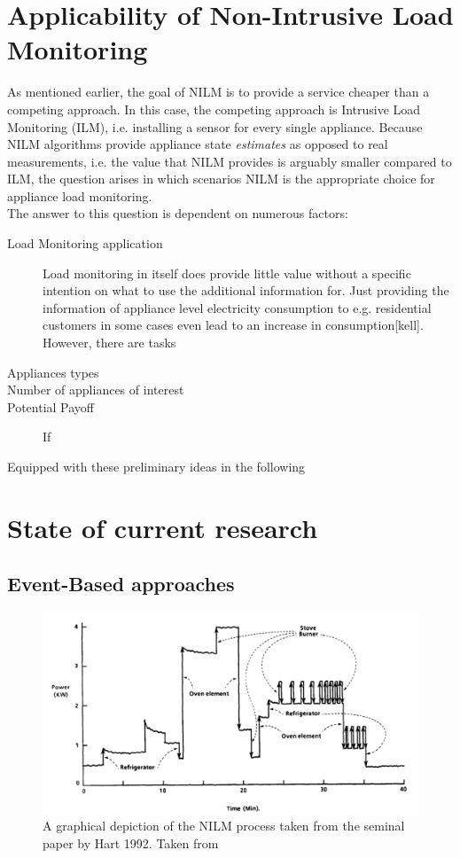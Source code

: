 \documentclass[11pt]{cmuthesis} %
\begin{document}
\section{Applicability of Non-Intrusive Load Monitoring}

As mentioned earlier, the goal of NILM is to provide a service cheaper than a competing approach. In this case, the competing approach is Intrusive Load Monitoring (ILM), i.e. installing a sensor for every single appliance. Because NILM algorithms provide appliance state \emph{estimates} as opposed to real measurements, i.e. the value that NILM provides is arguably smaller compared to ILM, the question arises in which scenarios NILM is the appropriate choice for appliance load monitoring.\\
The answer to this question is dependent on numerous factors:
\begin{description}
\item[Load Monitoring application] Load monitoring in itself does provide little value without a specific intention on what to use the additional information for. Just providing the information of appliance level electricity consumption to e.g. residential customers in some cases even lead to an increase in consumption[kell]. However, there are tasks 
\item[Appliances types]
\item[Number of appliances of interest]
\item[Potential Payoff] If
\end{description}

Equipped with these preliminary ideas in the following


\section{State of current research}

\subsection{Event-Based approaches}
\begin{figure}
\centering
\includegraphics[width=0.8\linewidth]{nilm_hart.png}
\caption[A graphical depiction of the NILM process.]{A graphical depiction of the NILM process taken from the seminal paper by Hart 1992. Taken from~\cite{hart1992nonintrusive}}
\label{fig:hart}
\end{figure}
\end{document}
